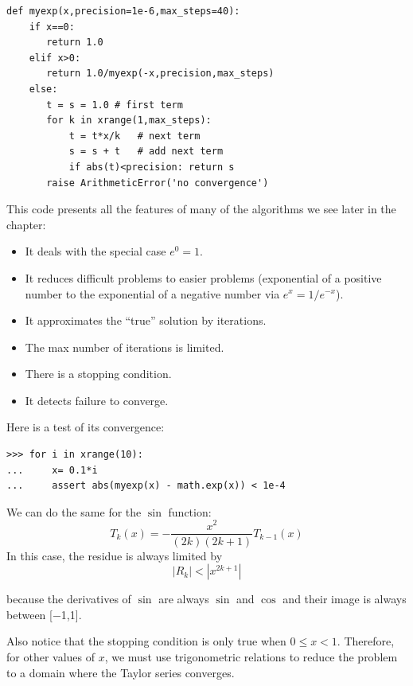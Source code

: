 \documentclass[justified,sixbynine]{tufte-book}
\def\ft{\small\tt}
\theoremstyle{plain}%
\theoremstyle{definition}
\theoremstyle{remark}
\begin{document}
\begin{fullwidth}
\begin{lstlisting}[caption={in file: {\ft nlib.py}}]
def myexp(x,precision=1e-6,max_steps=40):
    if x==0:
       return 1.0
    elif x>0:
       return 1.0/myexp(-x,precision,max_steps)
    else:
       t = s = 1.0 # first term
       for k in xrange(1,max_steps):
           t = t*x/k   # next term
           s = s + t   # add next term
           if abs(t)<precision: return s
       raise ArithmeticError('no convergence')
\end{lstlisting}

This code presents all the features of many of the algorithms we see later in the chapter:
\begin{itemize}
\item It deals with the special case $e^0=1$.
\item It reduces difficult problems to easier problems (exponential of a positive number to the exponential of a negative number via $e^x = 1/e^{-x}$).
\item It approximates the ``true'' solution by iterations.
\item The max number of iterations is limited.
\item There is a stopping condition.
\item It detects failure to converge.
\end{itemize}

Here is a test of its convergence:

\begin{lstlisting}[caption={in file: {\ft nlib.py}}]
>>> for i in xrange(10):
...     x= 0.1*i
...     assert abs(myexp(x) - math.exp(x)) < 1e-4
\end{lstlisting}

We can do the same for the $\sin$ function:
\begin{equation}
T_k(x) = -\frac{x^2}{(2k)(2k+1)}T_{k-1}(x)
\end{equation}
In this case, the residue is always limited by
\begin{equation}
|R_k| < |x^{2k+1}|
\end{equation}

because the derivatives of $\sin$ are always $\sin$ and $\cos$ and their image is always between [$-$1,1].

Also notice that the stopping condition is only true when $0\leq x<1$. Therefore, for other values of $x$, we must use trigonometric relations to reduce the problem to a domain where the Taylor series converges.


\end{fullwidth}
\end{document}
